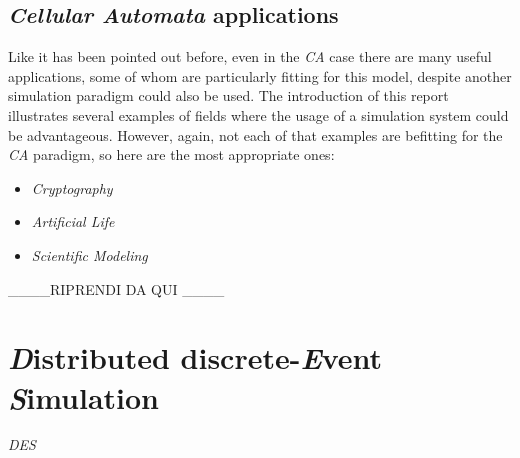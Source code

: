 \documentclass[12pt,a4paper,fleqn]{report}
\begin{document}
\section{\textit{Cellular Automata}  applications}

Like it has been pointed out before, even in the \textit{CA} case there are many useful applications, some of whom are particularly fitting for this model, despite another simulation paradigm could also be used. The introduction of this report illustrates several examples of fields where the usage of a simulation system could be advantageous. However, again, not each of that examples are befitting for the  \textit{CA} paradigm, so here are the most appropriate ones:
\begin{itemize}
\item
\textit{Cryptography} 
\item
\textit{Artificial Life}
\item
\textit{Scientific Modeling}
\end{itemize}

____RIPRENDI DA QUI ____

\newpage
\chapter{\textit{D}istributed discrete-\textit{E}vent \textit{S}imulation }{\Large{\textit{DES}}}\\
\end{document}
